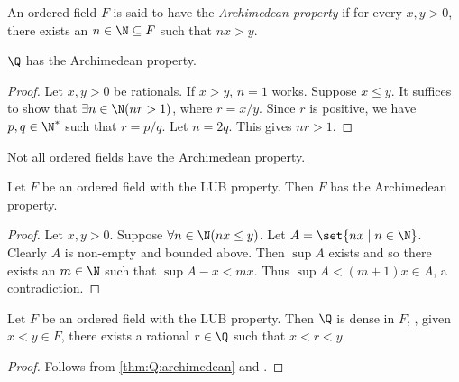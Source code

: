 \begin{definition} \label{def:archimedean}
    An ordered field $F$ is said to have the \emph{Archimedean property} if
    for every $x, y > 0$, there exists an $n \in \N \subseteq F$ such that
    $nx > y$.
\end{definition}

\begin{theorem} \label{thm:Q:archimedean}
    $\Q$ has the Archimedean property.
\end{theorem}
\begin{proof}
    Let $x, y > 0$ be rationals.
    If $x > y$, $n = 1$ works.
    Suppose $x \le y$.
    It suffices to show that $\exists n \in \N (nr > 1)$, where $r = x/y$.
    Since $r$ is positive, we have $p, q \in \N^*$ such that $r = p/q$.
    Let $n = 2q$.
    This gives $nr > 1$.
\end{proof}
\begin{remark}
    Not all ordered fields have the Archimedean property.
\end{remark}

\begin{theorem}
    Let $F$ be an ordered field with the LUB property.
    Then $F$ has the Archimedean property.
\end{theorem}
\begin{proof}
    Let $x, y > 0$.
    Suppose $\forall n \in \N (nx \le y)$.
    Let $A = \set{nx \mid n \in \N}$.
    Clearly $A$ is non-empty and bounded above.
    Then $\sup A$ exists and so there exists an $m \in \N$ such that
    $\sup A - x < m x$.
    Thus $\sup A < (m + 1)x \in A$, a contradiction.
\end{proof}

\begin{theorem}
    Let $F$ be an ordered field with the LUB property.
    Then $\Q$ is dense in $F$, \ie, given $x < y \in F$, there exists a
    rational $r \in \Q$ such that $x < r < y$.
\end{theorem}
\begin{proof}
    Follows from \cref{thm:Q:archimedean} and
    .
\end{proof}

